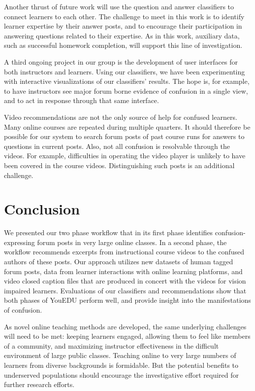 \documentclass{edm_template}
\begin{document}
Another thrust of future work will use the question and answer
classifiers to connect learners to each other. The challenge
to meet in this work is to identify learner expertise by their answer
posts, and to encourage their participation in answering questions
related to their expertise. As in this work, auxiliary data, such as
successful homework completion, will support this line of
investigation.

A third ongoing project in our group is the development of user
interfaces for both instructors and learners. Using our classifiers,
we have been experimenting with interactive visualizations of our
classifiers' results. The hope is, for example, to have instructors
see major forum borne evidence of confusion in a single view, and to
act in response through that same interface.

Video recommendations are not the only source of help for confused
learners. Many online courses are repeated during multiple
quarters. It should therefore be possible for our system to search
forum posts of past course runs for answers to questions in current
posts.  Also, not all confusion is resolvable through the videos. For
example, difficulties in operating the video player is unlikely to
have been covered in the course videos. Distinguishing such posts is
an additional challenge.

\section{Conclusion}
\label{sec:conclusion}
We presented our two phase workflow that in its first phase identifies
confusion-expressing forum posts in very large online classes. In a
second phase, the workflow recommends excerpts from instructional course
videos to the confused authors of these posts. Our approach utilizes new datasets
of human tagged forum posts, data from learner interactions with online learning
platforms, and video closed caption files that are produced in concert with the
videos for vision impaired learners. Evaluations of our classifiers and recommendations show that both phases of YouEDU perform well, and provide insight into the
manifestations of confusion.

As novel online teaching methods are developed, the same underlying
challenges will need to be met: keeping learners engaged, allowing
them to feel like members of a community, and maximizing instructor
effectiveness in the difficult environment of large public classes.
Teaching online to very large numbers of learners from diverse backgrounds is formidable.
But the potential benefits to underserved populations should encourage
the investigative effort required for further research efforts.
\end{document}
